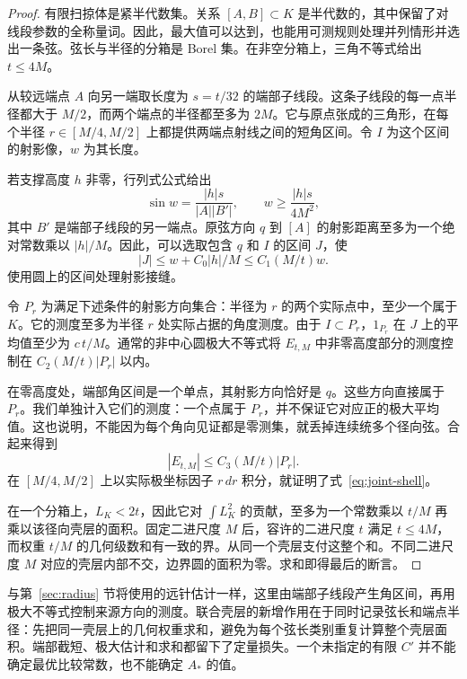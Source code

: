 \begin{proof}
有限扫掠体是紧半代数集。关系 $[A,B]\subset K$ 是半代数的，其中保留了对线段参数的全称量词。因此，最大值可以达到，也能用可测规则处理并列情形并选出一条弦。弦长与半径的分箱是 Borel 集。在非空分箱上，三角不等式给出 $t\le4M$。

从较远端点 $A$ 向另一端取长度为 $s=t/32$ 的端部子线段。这条子线段的每一点半径都大于 $M/2$，而两个端点的半径都至多为 $2M$。它与原点张成的三角形，在每个半径 $r\in[M/4,M/2]$ 上都提供两端点射线之间的短角区间。令 $I$ 为这个区间的射影像，$w$ 为其长度。

若支撑高度 $h$ 非零，行列式公式给出
\[
 \sin w=\frac{|h|s}{|A||B'|},\qquad
 w\ge\frac{|h|s}{4M^2},
\]
其中 $B'$ 是端部子线段的另一端点。原弦方向 $q$ 到 $[A]$ 的射影距离至多为一个绝对常数乘以 $|h|/M$。因此，可以选取包含 $q$ 和 $I$ 的区间 $J$，使
\[
 |J|\le w+C_0|h|/M\le C_1(M/t)w.
\]
使用圆上的区间处理射影接缝。

令 $P_r$ 为满足下述条件的射影方向集合：半径为 $r$ 的两个实际点中，至少一个属于 $K$。它的测度至多为半径 $r$ 处实际占据的角度测度。由于 $I\subset P_r$，$1_{P_r}$ 在 $J$ 上的平均值至少为 $c\,t/M$。通常的非中心圆极大不等式将 $E_{t,M}$ 中非零高度部分的测度控制在 $C_2(M/t)|P_r|$ 以内。

在零高度处，端部角区间是一个单点，其射影方向恰好是 $q$。这些方向直接属于 $P_r$。我们单独计入它们的测度：一个点属于 $P_r$，并不保证它对应正的极大平均值。这也说明，不能因为每个角向见证都是零测集，就丢掉连续统多个径向弦。合起来得到
\[
 |E_{t,M}|\le C_3(M/t)|P_r|.
\]
在 $[M/4,M/2]$ 上以实际极坐标因子 $r\,dr$ 积分，就证明了式~\eqref{eq:joint-shell}。

在一个分箱上，$L_K<2t$，因此它对 $\int L_K^2$ 的贡献，至多为一个常数乘以 $t/M$ 再乘以该径向壳层的面积。固定二进尺度 $M$ 后，容许的二进尺度 $t$ 满足 $t\le4M$，而权重 $t/M$ 的几何级数和有一致的界。从同一个壳层支付这整个和。不同二进尺度 $M$ 对应的壳层内部不交，边界圆的面积为零。求和即得最后的断言。
\end{proof}

与第~\ref{sec:radius} 节将使用的远针估计一样，这里由端部子线段产生角区间，再用极大不等式控制来源方向的测度。联合壳层的新增作用在于同时记录弦长和端点半径：先把同一壳层上的几何权重求和，避免为每个弦长类别重复计算整个壳层面积。端部截短、极大估计和求和都留下了定量损失。一个未指定的有限 $C'$ 并不能确定最优比较常数，也不能确定 $A_*$ 的值。

